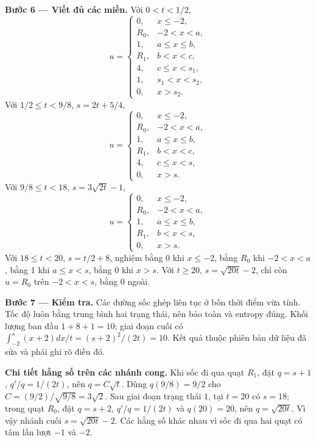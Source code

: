 \documentclass[10pt,a4paper]{article}
\begin{document}
\textbf{Bước 6 — Viết đủ các miền.} Với $0<t<1/2$,
\[u=\begin{cases}0,&x\le-2,\\R_0,&-2<x<a,\\1,&a\le x\le b,\\R_1,&b<x<c,\\4,&c\le x<s_1,\\1,&s_1<x<s_2,\\0,&x>s_2.\end{cases}\]
Với $1/2\le t<9/8$, $s=2t+5/4$,
\[u=\begin{cases}0,&x\le-2,\\R_0,&-2<x<a,\\1,&a\le x\le b,\\R_1,&b<x<c,\\4,&c\le x<s,\\0,&x>s.\end{cases}\]
Với $9/8\le t<18$, $s=3\sqrt{2t}-1$,
\[u=\begin{cases}0,&x\le-2,\\R_0,&-2<x<a,\\1,&a\le x\le b,\\R_1,&b<x<s,\\0,&x>s.\end{cases}\]
Với $18\le t<20$, $s=t/2+8$, nghiệm bằng 0 khi $x\le-2$, bằng $R_0$ khi $-2<x<a$, bằng 1 khi $a\le x<s$, bằng 0 khi $x>s$. Với $t\ge20$, $s=\sqrt{20t}-2$, chỉ còn $u=R_0$ trên $-2<x<s$, bằng 0 ngoài.

\textbf{Bước 7 — Kiểm tra.} Các đường sốc ghép liên tục ở bốn thời điểm vừa tính. Tốc độ luôn bằng trung bình hai trạng thái, nên bảo toàn và entropy đúng. Khối lượng ban đầu $1+8+1=10$; giai đoạn cuối có $\int_{-2}^s(x+2)dx/t=(s+2)^2/(2t)=10$. Kết quả thuộc phiên bản dữ liệu đã sửa và phải ghi rõ điều đó.

\textbf{Chi tiết hằng số trên các nhánh cong.} Khi sốc đi qua quạt $R_1$, đặt $q=s+1$, $q'/q=1/(2t)$, nên $q=C\sqrt t$. Dùng $q(9/8)=9/2$ cho $C=(9/2)/\sqrt{9/8}=3\sqrt2$. Sau giai đoạn trạng thái $1$, tại $t=20$ có $s=18$; trong quạt $R_0$, đặt $q=s+2$, $q'/q=1/(2t)$ và $q(20)=20$, nên $q=\sqrt{20t}$. Vì vậy nhánh cuối $s=\sqrt{20t}-2$. Các hằng số khác nhau vì sốc đi qua hai quạt có tâm lần lượt $-1$ và $-2$.
\end{document}
